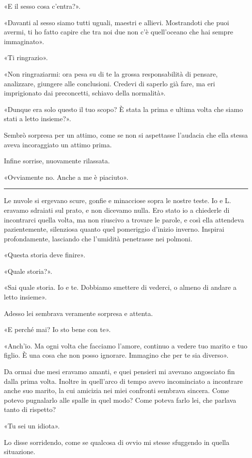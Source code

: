 \documentclass[a4paper,11pt,oneside,openright,final]{memoir}
\begin{document}
«E il sesso cosa c'entra?».

«Davanti al sesso siamo tutti uguali, maestri e allievi. Mostrandoti che puoi
avermi, ti ho fatto capire che tra noi due non c'è quell'oceano che hai sempre
immaginato».

«Ti ringrazio».

«Non ringraziarmi: ora pesa su di te la grossa responsabilità di pensare,
analizzare, giungere alle conclusioni. Credevi di saperlo già fare, ma eri
imprigionato dai preconcetti, schiavo della normalità».

«Dunque era solo questo il tuo scopo? È stata la prima e ultima volta che siamo
stati a letto insieme?».

Sembrò sorpresa per un attimo, come se non si aspettasse l'audacia che ella
stessa aveva incoraggiato un attimo prima.

Infine sorrise, nuovamente rilassata.

«Ovviamente no. Anche a me è piaciuto».

\plainbreak{1}

Le nuvole si ergevano scure, gonfie e minacciose sopra le nostre teste. Io e L.
eravamo sdraiati sul prato, e non dicevamo nulla. Ero stato io a chiederle di
incontrarci quella volta, ma non riuscivo a trovare le parole, e così ella
attendeva pazientemente, silenziosa quanto quel pomeriggio d'inizio inverno.
Inspirai profondamente, lasciando che l'umidità penetrasse nei polmoni.

«Questa storia deve finire».

«Quale storia?».

«Sai quale storia. Io e te. Dobbiamo smettere di vederci, o almeno di andare a
letto insieme».

Adesso lei sembrava veramente sorpresa e attenta.

«E perché mai? Io sto bene con te».

«Anch'io. Ma ogni volta che facciamo l'amore, continuo a vedere tuo marito e tuo
figlio. È una cosa che non posso ignorare. Immagino che per te sia diverso».

Da ormai due mesi eravamo amanti, e quei pensieri mi avevano angosciato fin
dalla prima volta. Inoltre in quell'arco di tempo avevo incominciato a
incontrare anche suo marito, la cui amicizia nei miei confronti sembrava
sincera. Come potevo pugnalarlo alle spalle in quel modo? Come poteva farlo lei,
che parlava tanto di rispetto?

«Tu sei un idiota».

Lo disse sorridendo, come se qualcosa di ovvio mi stesse sfuggendo in quella
situazione.
\end{document}
